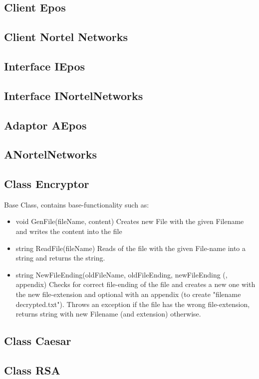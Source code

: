 \subsection{Client Epos}
\subsection{Client Nortel Networks}
\subsection{Interface IEpos}
\subsection{Interface INortelNetworks}
\subsection{Adaptor AEpos}
\subsection{ANortelNetworks}

\subsection{Class Encryptor}
Base Class, contains base-functionality such as:
\begin{itemize}
\item void GenFile(fileName, content)
\subitem Creates new File with the given Filename and writes the content into the file

\item string ReadFile(fileName)
\subitem Reads of the file with the given File-name into a string and returns the string.

\item string NewFileEnding(oldFileName, oldFileEnding, newFileEnding (, appendix)
\subitem Checks for correct file-ending of the file and creates a new one with the new file-extension and optional with an appendix (to create "filename decrypted.txt"). Throws an exception if the file has the wrong file-extension, returns string with new Filename (and extension) otherwise.

\end{itemize}
\subsection{Class Caesar}
\subsection{Class RSA}

